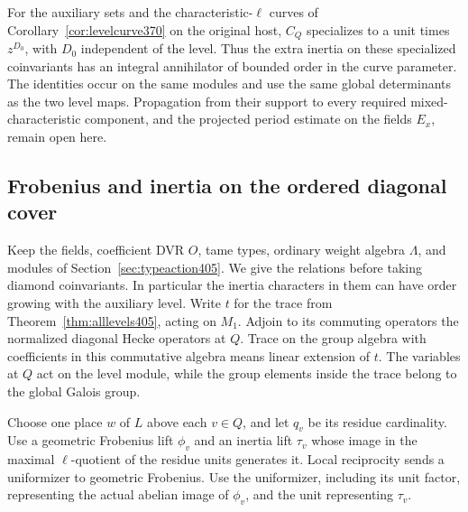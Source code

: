 \documentclass[a4paper,11pt]{article}
\theoremstyle{definition}
\theoremstyle{remark}
\numberwithin{equation}{section}
\begin{document}
For the auxiliary sets and the characteristic-\(\ell\) curves
of Corollary~\ref{cor:levelcurve370} on the original host,
\(C_Q\) specializes to a unit times \(z^{D_0}\), with \(D_0\)
independent of the level. Thus the extra inertia on these
specialized coinvariants has an integral annihilator of
bounded order in the curve parameter. The identities occur
on the same modules and use the same global determinants
as the two level maps. Propagation from their support to every
required mixed-characteristic component, and the projected
period estimate on the fields \(E_x\), remain open here.


\subsection{Frobenius and inertia on the ordered diagonal cover}
\label{sec:orderedinertia406}

Keep the fields, coefficient DVR \(O\), tame types, ordinary
weight algebra \(\Lambda\), and modules of
Section~\ref{sec:typeaction405}. We give the relations before
taking diamond coinvariants. In particular the inertia
characters in them can have order growing with the auxiliary
level. Write \(t\) for the trace from
Theorem~\ref{thm:alllevels405}, acting on \(M_1\). Adjoin
to its commuting operators the normalized diagonal
Hecke operators at \(Q\). Trace on the group algebra with
coefficients in this commutative algebra means linear
extension of \(t\). The variables at \(Q\) act on the level
module, while the group elements inside the trace belong to
the global Galois group.

Choose one place \(w\) of \(L\) above each \(v\in Q\), and
let \(q_v\) be its residue cardinality. Use a geometric
Frobenius lift \(\phi_v\) and an inertia lift \(\tau_v\) whose
image in the maximal \(\ell\)-quotient of the residue units
generates it. Local reciprocity sends a uniformizer to
geometric Frobenius. Use the uniformizer, including its
unit factor, representing the actual abelian image of
\(\phi_v\), and the unit representing \(\tau_v\).
\end{document}
